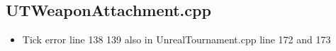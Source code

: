 \documentclass{article}
\begin{document}
                                                            \subsection{UTWeaponAttachment.cpp}
                                                            \begin{itemize}
                                                            \item Tick error line 138 139 also in UnrealTournament.cpp line 172 and 173
                                                            \end{itemize}
\end{document}

